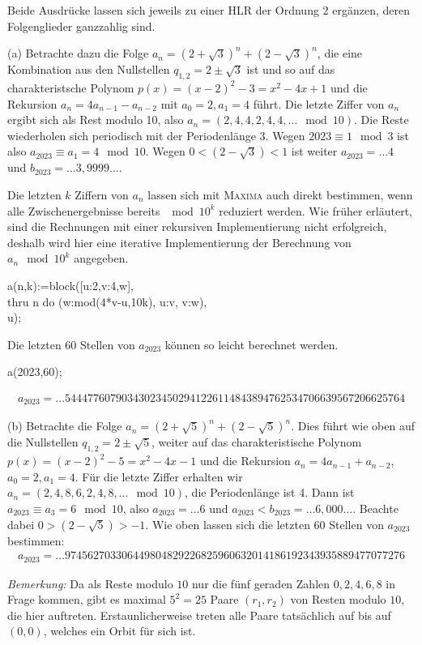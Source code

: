 \documentclass[11pt,a4paper]{article}
\newcommand{\cas}[1]{\textsc{#1}}
\begin{document}
\begin{loesung}
  Beide Ausdrücke lassen sich jeweils zu einer HLR der Ordnung 2 ergänzen,
  deren Folgenglieder ganzzahlig sind.

  (a) Betrachte dazu die Folge $a_n=(2+\sqrt{3})^{n}+(2-\sqrt{3})^{n}$, die
  eine Kombination aus den Nullstellen $q_{1,2}=2\pm\sqrt3$ ist und so auf das
  charakteristsche Polynom $p(x)=(x-2)^2-3=x^2-4x+1$ und die Rekursion
  $a_n=4a_{n-1}-a_{n-2}$ mit $a_0=2, a_1=4$ führt.  Die letzte Ziffer von
  $a_n$ ergibt sich als Rest modulo 10, also $a_n=(2,4,4,2,4,4,\dots
  \mod{10})$.  Die Reste wiederholen sich periodisch mit der Periodenlänge 3.
  Wegen $2023\equiv 1\mod{3}$ ist also $a_{2023}\equiv a_1=4\mod{10}$. Wegen
  $0<(2-\sqrt{3})<1$ ist weiter $a_{2023}=\dots4$ und
  $b_{2023}=\dots3{,}9999\dots$.

Die letzten $k$ Ziffern von $a_n$ lassen sich mit \cas{Maxima} auch direkt
bestimmen, wenn alle Zwischenergebnisse bereits $\mod{10^k}$ reduziert werden.
Wie früher erläutert, sind die Rechnungen mit einer rekursiven Implementierung
nicht erfolgreich, deshalb wird hier eine iterative Implementierung der
Berechnung von $a_n\mod{10^k}$ angegeben.
\begin{code}
a(n,k):=block([u:2,v:4,w],\+\\
  thru n do (w:mod(4*v-u,10\pw k), u:v, v:w),\\
  u);
\end{code}
Die letzten 60 Stellen von $a_{2023}$ können so leicht berechnet werden.
\begin{code}
  a(2023,60);
\end{code}
\begin{gather*}
  a_{2023}=\dots544477607903430234502941226114843894762534706639567206625764
\end{gather*}

(b) Betrachte die Folge $a_n=(2+\sqrt{5})^{n}+(2-\sqrt{5})^{n}$.  Dies führt
wie oben auf die Nullstellen $q_{1,2}=2\pm\sqrt5$, weiter auf das
charakteristische Polynom $p(x)=(x-2)^2-5=x^2-4x-1$ und die Rekursion
$a_n=4a_{n-1}+a_{n-2}$, $a_0=2, a_1=4$.  Für die letzte Ziffer erhalten wir
$a_n=(2,4,8,6,2,4,8,\dots \mod{10})$, die Periodenlänge ist 4. Dann ist
$a_{2023}\equiv a_3=6\mod{10}$, also $a_{2023}=\dots6$ und
$a_{2023}<b_{2023}=\dots6{,}000\dots$.  Beachte dabei $0>(2-\sqrt{5})>-1$.
Wie oben lassen sich die letzten 60 Stellen von $a_{2023}$ bestimmen:
\begin{gather*}
  a_{2023}=\dots974562703306449804829226825960632014186192343935889477077276
\end{gather*}

\emph{Bemerkung:} Da als Reste modulo $10 $ nur die fünf geraden Zahlen
$0,2,4,6,8$ in Frage kommen, gibt es maximal $5^2=25 $ Paare $(r_1,r_2)$ von
Resten modulo $10$, die hier auftreten. Erstaunlicherweise treten alle Paare
tatsächlich auf bis auf $(0,0)$, welches ein Orbit für sich ist.
\end{loesung}
\end{document}
